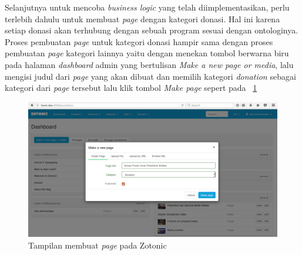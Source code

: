 Selanjutnya untuk mencoba \textit{business logic} yang telah diimplementasikan, perlu terlebih dahulu untuk membuat \textit{page} dengan kategori donasi. Hal ini karena setiap donasi akan terhubung dengan sebuah program sesuai dengan ontologinya. Proses pembuatan \textit{page} untuk kategori donasi hampir sama dengan proses pembuatan \textit{page} kategori lainnya yaitu dengan menekan tombol berwarna biru pada halaman \textit{dashboard} admin yang bertulisan \textit{Make a new page or media}, lalu mengisi judul dari \textit{page} yang akan dibuat dan memilih kategori \textit{donation} sebagai kategori dari \textit{page} tersebut lalu klik tombol \textit{Make page} sepert pada \pic~\ref{fig:createdonation}
\begin{figure}
	\centering
	\includegraphics[width=1\textwidth]
	{pics/6-createDonation.png}
	\caption{Tampilan membuat \textit{page} pada Zotonic}
	\label{fig:createdonation}
\end{figure}
\vspace{-0.3cm}

